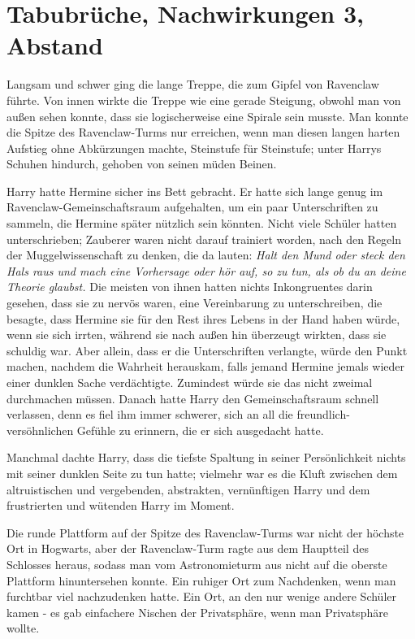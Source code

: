 \chapter{Tabubrüche, Nachwirkungen 3, Abstand}

Langsam und schwer ging die lange Treppe, die zum Gipfel von Ravenclaw führte.
Von innen wirkte die Treppe wie eine gerade Steigung, obwohl man von außen sehen
konnte, dass sie logischerweise eine Spirale sein musste. Man konnte die Spitze
des Ravenclaw-Turms nur erreichen, wenn man diesen langen harten Aufstieg ohne
Abkürzungen machte, Steinstufe für Steinstufe; unter Harrys Schuhen hindurch,
gehoben von seinen müden Beinen.

Harry hatte Hermine sicher ins Bett gebracht. Er hatte sich lange genug im
Ravenclaw-Gemeinschaftsraum aufgehalten, um ein paar Unterschriften zu sammeln,
die Hermine später nützlich sein könnten. Nicht viele Schüler hatten
unterschrieben; Zauberer waren nicht darauf trainiert worden, nach den Regeln
der Muggelwissenschaft zu denken, die da lauten: \emph{Halt den Mund oder steck
den Hals raus und mach eine Vorhersage oder hör auf, so zu tun, als ob du an
deine Theorie glaubst. }Die meisten von ihnen hatten nichts Inkongruentes darin
gesehen, dass sie zu nervös waren, eine Vereinbarung zu unterschreiben, die
besagte, dass Hermine sie für den Rest ihres Lebens in der Hand haben würde,
wenn sie sich irrten, während sie nach außen hin überzeugt wirkten, dass sie
schuldig war. Aber allein, dass er die Unterschriften verlangte, würde den Punkt
machen, nachdem die Wahrheit herauskam, falls jemand Hermine jemals wieder einer
dunklen Sache verdächtigte. Zumindest würde sie das nicht zweimal durchmachen
müssen. Danach hatte Harry den Gemeinschaftsraum schnell verlassen, denn es fiel
ihm immer schwerer, sich an all die freundlich-versöhnlichen Gefühle zu
erinnern, die er sich ausgedacht hatte.

Manchmal dachte Harry, dass die tiefste Spaltung in seiner Persönlichkeit nichts
mit seiner dunklen Seite zu tun hatte; vielmehr war es die Kluft zwischen dem
altruistischen und vergebenden, abstrakten, vernünftigen Harry und dem
frustrierten und wütenden Harry im Moment.

Die runde Plattform auf der Spitze des Ravenclaw-Turms war nicht der höchste Ort
in Hogwarts, aber der Ravenclaw-Turm ragte aus dem Hauptteil des Schlosses
heraus, sodass man vom Astronomieturm aus nicht auf die oberste Plattform
hinuntersehen konnte. Ein ruhiger Ort zum Nachdenken, wenn man furchtbar viel
nachzudenken hatte. Ein Ort, an den nur wenige andere Schüler kamen - es gab
einfachere Nischen der Privatsphäre, wenn man Privatsphäre wollte.

